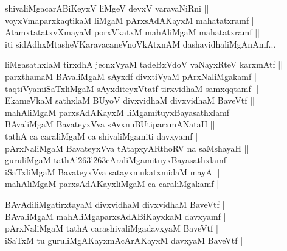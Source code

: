 \begin{entry}
\begin{shl}
shivaliMgacarABiKeyxV liMgeV devxV varavaNiRni ||\\[2pt]
voyxVmaparxkaqtikaM liMgaM pArxsAdAKayxM mahatatxramf |\\[2pt]
AtamxtatatxvXmayaM porxVkatxM mahAliMgaM mahatatxramf ||\\[2pt]
iti sidAdhxMtasheVKaravacaneVnoVkAtxnAM dashavidhaliMgAnAmf...\\[-1pt]
\end{shl}
\medskip
{}
\smallskip
{}
\smallskip
\begin{shl}
liMgasathxlaM tirxdhA jecnxVyaM tadeBxVdoV vaNayxRteV karxmAtf ||\\[2pt]
parxthamaM BAvaliMgaM sAyxdf divxtiVyaM pArxNaliMgakamf |\\[2pt]
taqtiVyamiSaTxliMgaM sAyxditeyxVtatf tirxvidhaM samxqqtamf ||\\[2pt]
EkameVkaM sathxlaM BUyoV divxvidhaM divxvidhaM BaveVtf ||\\[2pt]
mahAliMgaM parxsAdAKayxM liMgamituyxBayasathxlamf |\\[2pt]
BAvaliMgaM BavateyxVva sAvxnuBUtiparxmANataH ||\\[2pt]
tathA ca caraliMgaM ca shivaliMgamiti davxyamf |\\[2pt]
pArxNaliMgaM BavateyxVva tAtapxyARthoRV na saMshayaH ||\\[2pt]
guruliMgaM tathA{\char'263\char'263}cAraliMgamituyxBayasathxlamf |\\[2pt]
iSaTxliMgaM BavateyxVva satayxmukatxmidaM mayA ||\\[2pt]
mahAliMgaM parxsAdAKayxliMgaM ca caraliMgakamf |\\[-1pt]
\end{shl}
\medskip
{}
\smallskip
\begin{shl}
BAvAdiliMgatirxtayaM divxvidhaM divxvidhaM BaveVtf |\\[2pt]
BAvaliMgaM mahAliMgaparxsAdABiKayxkaM davxyamf ||\\[2pt]
pArxNaliMgaM tathA carashivaliMgadavxyaM BaveVtf |\\[2pt]
iSaTxM tu guruliMgAKayxmAcArAKayxM davxyaM BaveVtf |\\[-1pt]

\end{shl}
\end{entry}
